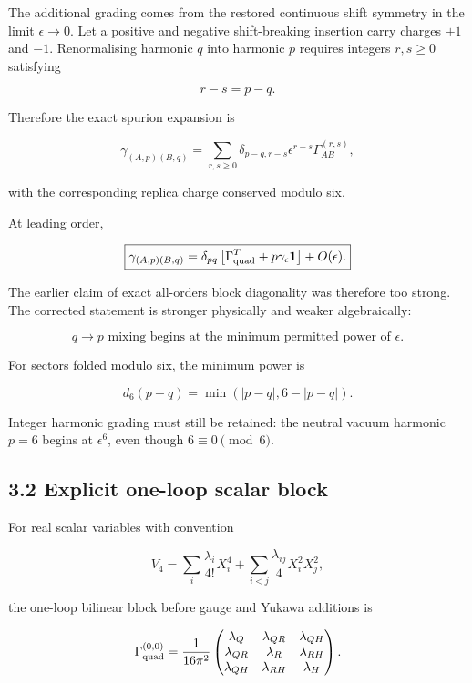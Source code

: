 \documentclass[
  10pt,
]{article}
\begin{document}
The additional grading comes from the restored continuous shift symmetry
in the limit \(\epsilon\to0\). Let a positive and negative
shift-breaking insertion carry charges \(+1\) and \(-1\). Renormalising
harmonic \(q\) into harmonic \(p\) requires integers \(r,s\ge0\)
satisfying

\[
r-s=p-q.
\]

Therefore the exact spurion expansion is

\[
\boxed{
\gamma_{(A,p)(B,q)}
=
\sum_{r,s\ge0}
\delta_{p-q,r-s}
\epsilon^{r+s}
\Gamma_{AB}^{(r,s)},
}
\]

with the corresponding replica charge conserved modulo six.

At leading order,

\[
\boxed{
\gamma_{(A,p)(B,q)}
=
\delta_{pq}
\left[
\Gamma_{\rm quad}^{T}
+p\gamma_\epsilon\mathbf1
\right]
+O(\epsilon).
}
\]

The earlier claim of exact all-orders block diagonality was therefore
too strong. The corrected statement is stronger physically and weaker
algebraically:

\[
\boxed{
q\to p\text{ mixing begins at the minimum permitted power of }\epsilon.
}
\]

For sectors folded modulo six, the minimum power is

\[
d_6(p-q)=\min\left(|p-q|,6-|p-q|\right).
\]

Integer harmonic grading must still be retained: the neutral vacuum
harmonic \(p=6\) begins at \(\epsilon^6\), even though
\(6\equiv0\pmod6\).

\subsection{3.2 Explicit one-loop scalar
block}\label{explicit-one-loop-scalar-block}

For real scalar variables with convention

\[
V_4
=
\sum_i\frac{\lambda_i}{4!}X_i^4
+
\sum_{i<j}\frac{\lambda_{ij}}4X_i^2X_j^2,
\]

the one-loop bilinear block before gauge and Yukawa additions is

\[
\Gamma_{\rm quad}^{(0,0)}
=
\frac1{16\pi^2}
\begin{pmatrix}
\lambda_Q&\lambda_{QR}&\lambda_{QH}\\
\lambda_{QR}&\lambda_R&\lambda_{RH}\\
\lambda_{QH}&\lambda_{RH}&\lambda_H
\end{pmatrix}.
\]
\end{document}
